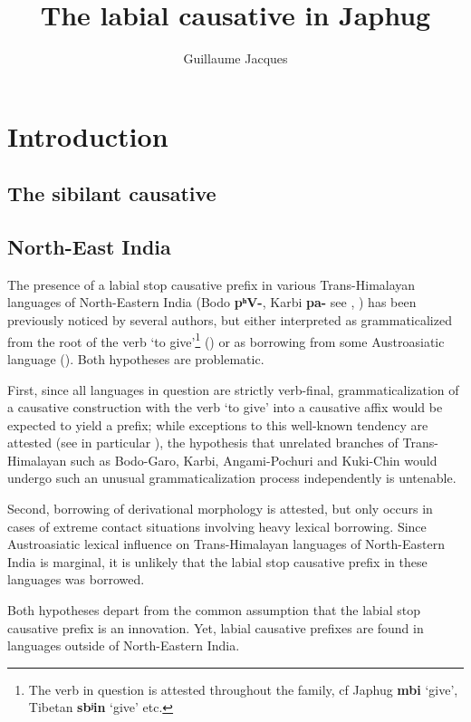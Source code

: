 \documentclass[oldfontcommands,oneside,a4paper,11pt]{article}
\newcommand{\ipa}[1]{\textbf{{\phon\mbox{#1}}}} %
\begin{document}
\title{The labial causative in Japhug}
\author{Guillaume Jacques}
\maketitle
\sloppy

\section{Introduction}


\subsection{The sibilant causative}
\citet{jacques15causative}

\subsection{North-East India}
The presence of a labial stop causative prefix in various Trans-Himalayan languages of North-Eastern India (Bodo \ipa{pʰV-}, Karbi \ipa{pa-} see \citealt{delancey15adjectival}, \citealt{konnerth15cisloc}) has been previously noticed by several authors, but either interpreted as  grammaticalized from the root of the verb `to give'\footnote{The verb in question is attested throughout the family, cf Japhug \ipa{mbi} `give', Tibetan \ipa{sbʲin} `give' etc.}
(\citealt[132]{matisoff03}) or as borrowing from some Austroasiatic language (\citealt{konnerth15cisloc, delancey15adjectival}). Both hypotheses are problematic. 

First, since all languages in question are strictly verb-final, grammaticalization of a causative construction with the verb `to give' into a causative affix would be expected to yield a prefix; while exceptions to this well-known tendency are attested (see in particular \citealt{jacques13harmonization}), the hypothesis that unrelated branches of Trans-Himalayan such as Bodo-Garo, Karbi, Angami-Pochuri and Kuki-Chin would undergo such an unusual grammaticalization process independently is untenable. 

Second, borrowing of derivational morphology is attested, but only occurs in cases of extreme contact situations involving heavy lexical borrowing. Since Austroasiatic lexical influence on Trans-Himalayan languages of North-Eastern India is marginal, it is unlikely that the labial stop causative prefix in these languages was borrowed.

Both hypotheses depart from the common assumption that the labial stop causative prefix is an innovation. Yet, labial causative prefixes are found in languages outside of North-Eastern India. 
\end{document}
